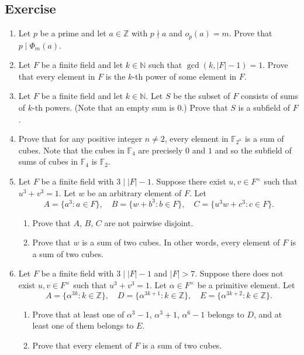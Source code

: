 \documentclass{article}
\def\Z{{\mathbb Z}}
\def\F{{\mathbb F}}
\def\N{{\mathbb N}}
\def\Z{{\mathbb Z}}
\def\F{{\mathbb F}}
\begin{document}
\subsection*{Exercise}
\begin{enumerate}[\thesection .1]
    \item Let $p$ be a prime and let $a\in\Z$ with $p\nmid a$ and $o_p(a) = m$. Prove that $p\mid \Phi_m(a)$.
    \item Let $F$ be a finite field and let $k\in\N$ such that $\gcd(k,|F| - 1) = 1$. Prove that every element in $F$ is the $k$-th power of some element in $F$.\label{exer:10.1}
    \item Let $F$ be a finite field and let $k\in\N$. Let $S$ be the subset of $F$ consists of sums of $k$-th powers. (Note that an empty sum is $0$.) Prove that $S$ is a subfield of $F$.
    \item Prove that for any positive integer $n\neq 2$, every element in $\F_{2^n}$ is a sum of cubes. Note that the cubes in $\F_4$ are precisely $0$ and $1$ and so the subfield of sums of cubes in $\F_4$ is $\F_2$.
    \item Let $F$ be a finite field with $3\mid |F| - 1$. Suppose there exist $u,v\in F^\times$ such that $u^3 + v^3 = 1$. Let $w$ be an arbitrary element of $F$. Let
    $$A = \{a^3\colon a\in F\},\quad B = \{w + b^3\colon b\in F\},\quad C = \{u^3w + c^3\colon c\in F\}.$$
    \begin{enumerate}
        \item Prove that $A$, $B$, $C$ are not pairwise disjoint.
        \item Prove that $w$ is a sum of two cubes. In other words, every element of $F$ is a sum of two cubes.
    \end{enumerate}\label{exer:10.4}
    \item Let $F$ be a finite field with $3\mid |F| - 1$ and $|F| > 7$. Suppose there does not exist $u,v\in F^\times$ such that $u^3 + v^3 = 1$. Let $\alpha\in F^\times$ be a primitive element. Let
    $$A = \{\alpha^{3k}\colon k\in\Z\},\quad D = \{\alpha^{3k+1}\colon k\in\Z\},\quad E = \{\alpha^{3k+2}\colon k\in\Z\}.$$
    \begin{enumerate}
        \item Prove that at least one of $\alpha^3-1$, $\alpha^3 +1$, $\alpha^6-1$ belongs to $D$, and at least one of them belongs to $E$.
        \item Prove that every element of $F$ is a sum of two cubes.
    \end{enumerate}\label{exer:10.5}

\end{enumerate}
\end{document}
